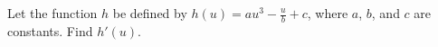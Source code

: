 Let the function $h$ be defined by $h(u)=au^3-\frac{u}{b}+c$, where $a$, $b$,
and $c$ are constants. Find $h'(u)$.\answercheck

